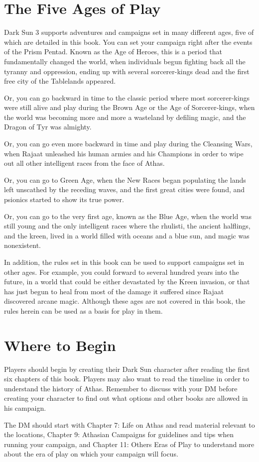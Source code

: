 \section{The Five Ages of Play}

{\tableheader Dark Sun} 3 supports adventures and campaigns set in many different ages, five of which are detailed in this book. You can set your campaign right after the events of the Prism Pentad. Known as the Age of Heroes, this is a period that fundamentally changed the world, when individuals begun fighting back all the tyranny and oppression, ending up with several sorcerer-kings dead and the first free city of the Tablelands appeared.

Or, you can go backward in time to the classic period where most sorcerer-kings were still alive and play during the Brown Age or the Age of Sorcerer-kings, when the world was becoming more and more a wasteland by defiling magic, and the Dragon of Tyr was almighty.

Or, you can go even more backward in time and play during the Cleansing Wars, when Rajaat unleashed his human armies and his Champions in order to wipe out all other intelligent races from the face of Athas.

Or, you can go to Green Age, when the New Races began populating the lands left unscathed by the receding waves, and the first great cities were found, and psionics started to show its true power.

Or, you can go to the very first age, known as the Blue Age, when the world was still young and the only intelligent races where the rhulisti, the ancient halflings, and the kreen, lived in a world filled with oceans and a blue sun, and magic was nonexistent.

In addition, the rules set in this book can be used to support campaigns set in other ages. For example, you could forward to several hundred years into the future, in a world that could be either devastated by the Kreen invasion, or that has just begun to heal from most of the damage it suffered since Rajaat discovered arcane magic. Although these ages are not covered in this book, the rules herein can be used as a basis for play in them.

\section{Where to Begin}

Players should begin by creating their {\tableheader Dark Sun} character after reading the first six chapters of this book. Players may also want to read the timeline in order to understand the history of Athas. Remember to discuss with your DM before creating your character to find out what options and other books are allowed in his campaign.

The DM should start with Chapter 7: Life on Athas and read material relevant to the locations, Chapter 9: Athasian Campaigns for guidelines and tips when running your campaign, and Chapter 11: Others Eras of Play to understand more about the era of play on which your campaign will focus.
